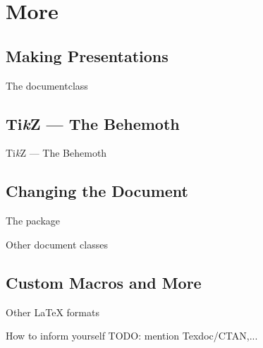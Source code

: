 \section{More}

\subsection{Making Presentations}
\begin{frame}{The  documentclass}

\end{frame}

\subsection{Ti\textit{k}Z --- The Behemoth}
\begin{frame}{Ti\textit{k}Z --- The Behemoth}

\end{frame}

\subsection{Changing the Document}
\begin{frame}{The  package}

\end{frame}

\begin{frame}{Other document classes}

\end{frame}

\subsection{Custom Macros and More}
\begin{frame}

\end{frame}

\begin{frame}{Other \LaTeX{} formats}

\end{frame}

\begin{frame}{How to inform yourself}
TODO: mention Texdoc/CTAN,...
\end{frame}
